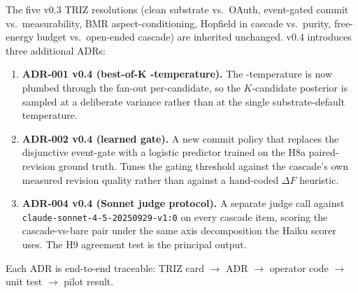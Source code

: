 The five v0.3 TRIZ resolutions (clean substrate vs.\ OAuth, event-gated commit vs.\ measurability, BMR aspect-conditioning, Hopfield in cascade vs.\ purity, free-energy budget vs.\ open-ended cascade) are inherited unchanged. v0.4 introduces three additional ADRs:

\begin{enumerate}[leftmargin=1.4em]
\item \textbf{ADR-001 v0.4 (best-of-K -temperature).} The -temperature is now plumbed through the  fan-out per-candidate, so the $K$-candidate posterior is sampled at a deliberate variance rather than at the single substrate-default temperature.
\item \textbf{ADR-002 v0.4 (learned gate).} A new commit policy that replaces the disjunctive event-gate with a logistic predictor trained on the H8a paired-revision ground truth. Tunes the gating threshold against the cascade's own measured revision quality rather than against a hand-coded $\Delta F$ heuristic.
\item \textbf{ADR-004 v0.4 (Sonnet judge protocol).} A separate judge call against \texttt{claude-sonnet-4-5-20250929-v1:0} on every cascade item, scoring the cascade-vs-bare pair under the same axis decomposition the Haiku scorer uses. The H9 agreement test is the principal output.
\end{enumerate}

Each ADR is end-to-end traceable: TRIZ card $\to$ ADR $\to$ operator code $\to$ unit test $\to$ pilot result.
